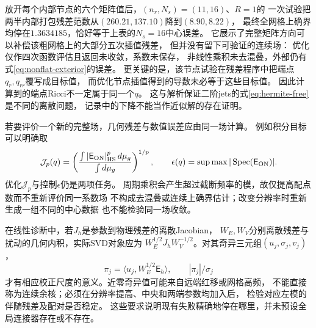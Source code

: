 \documentclass[UTF8,a4paper,11pt,fontset=fandol]{ctexart}
\numberwithin{equation}{section}
\theoremstyle{definition}
\newcommand{\spec}{\operatorname{Spec}}
\begin{document}
放开每个内部节点的六个矩阵值后，$(n_r,N_s)=(11,16)$、$R=1$的
一次试验把两半内部打包残差范数从$(260.21,137.10)$降到$(8.90,8.22)$，
最终全网格上确界均停在$1.3634185$，恰好等于上表的$N_s=16$中心误差。
它展示了完整矩阵方向可以补偿该粗网格上的大部分五次插值残差，
但并没有留下可验证的连续场：
优化仅作四次函数评估且返回未收敛，系数未保存，
非线性乘积未去混叠，外部仍有式\eqref{eq:nonflat-exterior}的误差。
更关键的是，该节点试验在残差程序中把端点$q_r,q_{rr}$覆写成目标值，
而优化节点插值得到的导数未必等于这些目标值。
因此计算到的端点Ricci不一定属于同一个$q$。
这与解析保证二阶jets的式\eqref{eq:hermite-free}是不同的离散问题，
记录中的下降不能当作近似解的存在证明。

若要评价一个新的完整场，几何残差与数值误差应由同一场计算。
例如积分目标可以明确取
\[
 \mathcal J_p(q)=
 \left(\frac{\int |\mathsf E_{\rm ON}|_{\rm HS}^p\,d\mu_g}
                  {\int d\mu_g}\right)^{1/p},
 \qquad \epsilon(q)=\sup\max|\spec(\mathsf E_{\rm ON})|.
\]
优化$\mathcal J_p$与控制$\epsilon$仍是两项任务。
周期乘积会产生超过截断频率的模，故仅提高配点数而不重新评价同一系数场
不构成去混叠或连续上确界估计；改变分辨率时重新生成一组不同的中心数据
也不能检验同一场收敛。

在线性诊断中，若$J_h$是参数到物理残差的离散Jacobian，
$W_E,W_V$分别离散残差与扰动的几何内积，实际SVD对象应为
$W_E^{1/2}J_hW_V^{-1/2}$。对其奇异三元组$(u_j,\sigma_j,v_j)$，
\[
 \pi_j=\langle u_j,W_E^{1/2}\mathsf E_h\rangle,\qquad
 |\pi_j|/\sigma_j
\]
才有相应校正尺度的意义。近零奇异值可能来自远端红移或网格高频，
不能直接称为连续余核；必须在分辨率提高、中央和两端参数均加入后，
检验对应左模的伴随残差及配对是否稳定。
这些要求说明现有失败精确地停在哪里，并未预设全局连接器存在或不存在。
\end{document}

